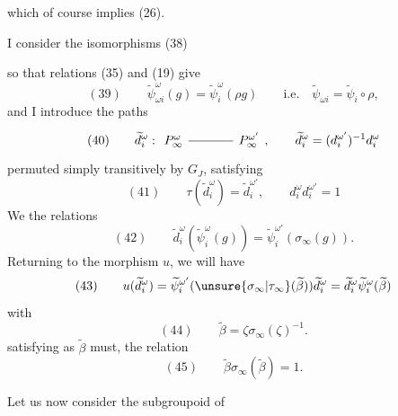 which of course implies (26).

I  consider the isomorphisms
\quad(38)

so that relations (35) and (19) give
\[
(39)\qquad \widetilde\psi_{\omega i}^\omega(g)=\widetilde\psi_i^\omega(\rho g)
\qquad\text{i.e.}\quad\widetilde\psi_{\omega i}=\widetilde\psi_i\circ\rho,
\]
and I introduce the paths
\[
(40)\qquad\widetilde d_i^\omega:
\begin{tikzcd}[ampersand replacement=\&,column sep=large]
P_{\infty}^\omega\arrow[r,no head]\&P_{\infty}^{\omega'}
\end{tikzcd},\qquad
\widetilde d_i^\omega=(d_i^{\omega'})^{-1}d_i^\omega
\]
permuted simply transitively by $G_J$,
 satisfying
\[
(41)\qquad\tau(\widetilde d_i^\omega)=\widetilde d_i^{\omega'},\qquad
 d_i^\omega d_i^{\omega'}=1
\]
We   the relations
\[
(42)\qquad\widetilde d_i^\omega(\widetilde\psi_i^\omega(g))=
\widetilde\psi_i^{\omega'}(\sigma_\infty(g)).
\]
Returning to the morphism $u$, we will have 
\[
(43)\qquad u(\widetilde d_i^\omega)=\widetilde\psi_i^{\omega'}(\unsure{\sigma_\infty|\tau_\infty}(\widetilde\beta))\widetilde d_i^\omega
=\widetilde d_i^\omega\widetilde\psi_i^\omega(\widetilde\beta)
\]
with
\[
(44)\qquad\widetilde\beta=\zeta\sigma_\infty(\zeta)^{-1}.
\]
satisfying   as $\widetilde\beta$ must, the relation
\[
(45)\qquad\widetilde\beta\sigma_\infty(\widetilde\beta)=1.
\]

Let us now consider the subgroupoid of
